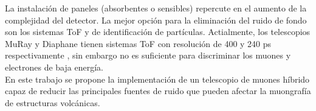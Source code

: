 La instalación de paneles (absorbentes o sensibles) repercute en el aumento de la complejidad del detector. La mejor opción para la eliminación del ruido de fondo son los sistemas ToF y de identificación de partículas. Actialmente, los telescopios MuRay y Diaphane tienen sistemas ToF con resolución de 400 y 240 ps respectivamente \cite{Cimmino2017, Marteau2014}, sin embargo no es suficiente para discriminar los muones y electrones de baja energía.\\

En este trabajo se propone la implementación de un telescopio de muones híbrido capaz de reducir las principales fuentes de ruido que pueden afectar la muongrafía de estructuras volcánicas.

